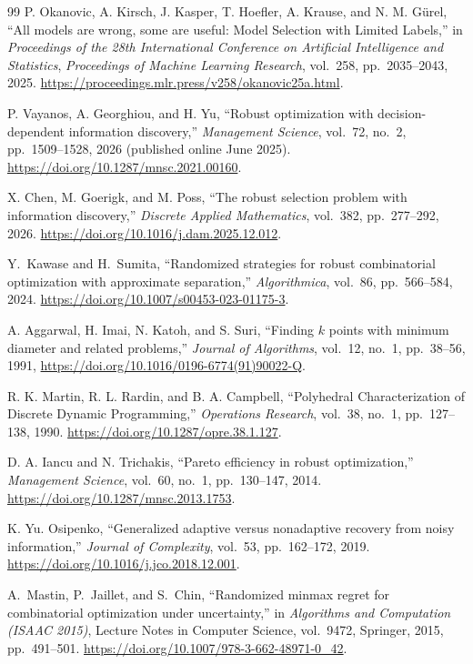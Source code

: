 \documentclass[12pt]{article}
\begin{document}
\begin{thebibliography}{99}
 P. Okanovic, A. Kirsch, J. Kasper, T. Hoefler,
A. Krause, and N. M. G\"urel, ``All models are wrong, some are useful:
Model Selection with Limited Labels,'' in \emph{Proceedings of the 28th
International Conference on Artificial Intelligence and Statistics},
\emph{Proceedings of Machine Learning Research}, vol.~258, pp.~2035--2043,
2025. \url{https://proceedings.mlr.press/v258/okanovic25a.html}.

 P. Vayanos, A. Georghiou, and H. Yu,
``Robust optimization with decision-dependent information discovery,''
\emph{Management Science}, vol.~72, no.~2, pp.~1509--1528, 2026
(published online June 2025).
\url{https://doi.org/10.1287/mnsc.2021.00160}.

 X. Chen, M. Goerigk, and M. Poss, ``The robust selection
problem with information discovery,'' \emph{Discrete Applied Mathematics},
vol.~382, pp.~277--292, 2026. \url{https://doi.org/10.1016/j.dam.2025.12.012}.

Y.~Kawase and H.~Sumita, ``Randomized strategies for robust combinatorial
optimization with approximate separation,'' \emph{Algorithmica}, vol.~86,
pp.~566--584, 2024. \url{https://doi.org/10.1007/s00453-023-01175-3}.

 A. Aggarwal, H. Imai, N. Katoh, and S. Suri, ``Finding
$k$ points with minimum diameter and related problems,'' \emph{Journal of
Algorithms}, vol.~12, no.~1, pp.~38--56, 1991,
\url{https://doi.org/10.1016/0196-6774(91)90022-Q}.

 R. K. Martin, R. L. Rardin, and B. A. Campbell,
``Polyhedral Characterization of Discrete Dynamic Programming,''
\emph{Operations Research}, vol.~38, no.~1, pp.~127--138, 1990.
\url{https://doi.org/10.1287/opre.38.1.127}.

 D. A. Iancu and N. Trichakis, ``Pareto efficiency in robust
optimization,'' \emph{Management Science}, vol.~60, no.~1, pp.~130--147, 2014.
\url{https://doi.org/10.1287/mnsc.2013.1753}.


 K. Yu. Osipenko,
``Generalized adaptive versus nonadaptive recovery from noisy information,''
\emph{Journal of Complexity}, vol.~53, pp.~162--172, 2019.
\url{https://doi.org/10.1016/j.jco.2018.12.001}.

A.~Mastin, P.~Jaillet, and S.~Chin, ``Randomized minmax regret for
combinatorial optimization under uncertainty,'' in \emph{Algorithms and
Computation (ISAAC 2015)}, Lecture Notes in Computer Science, vol.~9472,
Springer, 2015, pp.~491--501.
\url{https://doi.org/10.1007/978-3-662-48971-0_42}.


\end{thebibliography}
\end{document}
